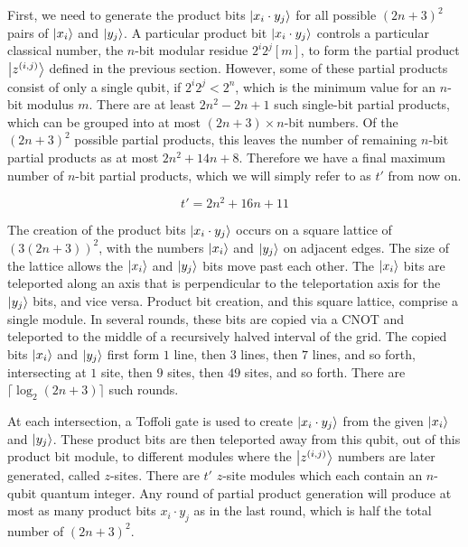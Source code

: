 \documentclass[twoside]{article}
\begin{document}
First, we need to generate the product bits
$\left\vert{x_i\cdot y_j}\right\rangle$ for all possible $(2n+3)^2$ pairs of $\left\vert{x_i}\right\rangle$ and
$\left\vert{y_j}\right\rangle$.
A particular product bit $\left\vert{x_i \cdot y_j}\right\rangle$
controls a particular classical number, the
$n$-bit modular residue $2^i 2^j [m]$, to form the partial product
$\left\vert{z^{(i,j)}}\right\rangle$ defined
in the previous section. However, some of these partial products
consist of only a single qubit, if $2^i 2^j < 2^n$, which is the minimum
value for an $n$-bit modulus $m$. There are at least $2n^2 - 2n + 1$
such single-bit partial products, which can be grouped into at most
$(2n+3)\times n$-bit numbers. Of the $(2n+3)^2$ possible partial products,
this leaves the number of remaining $n$-bit partial products as at most
$2n^2 + 14n +8$. Therefore we have a final maximum number of $n$-bit
partial products, which we will simply refer to as $t'$ from now on.

\begin{equation}
t'=2n^2+16n+11
\label{eqn:tprime}
\end{equation}

The creation of the product bits $\left\vert{x_i \cdot y_j}\right\rangle$ occurs on a
square lattice of $(3(2n+3))^2$, with the numbers $\left\vert{x_i}\right\rangle$ and
$\left\vert{y_j}\right\rangle$ on adjacent edges. The size of the lattice
allows the $\left\vert{x_i}\right\rangle$ and $\left\vert{y_j}\right\rangle$ bits move past each other.
The $\left\vert{x_i}\right\rangle$ bits are teleported along an axis that is perpendicular to
the teleportation axis for the $\left\vert{y_j}\right\rangle$ bits, and vice versa.
Product bit creation, and this square lattice, comprise a single module.
In several
rounds, these bits are copied via a CNOT and teleported to the middle of
a recursively halved interval of the grid. The copied bits $\left\vert{x_i}\right\rangle$ and
$\left\vert{y_j}\right\rangle$
first form $1$ line, then $3$ lines, then $7$ lines, and so forth,
intersecting at $1$ site, then $9$ sites, then $49$ sites, and so forth.
There are $\lceil \log_2 (2n+3) \rceil$ such rounds.

At each intersection, a Toffoli gate is used to create $\left\vert{x_i \cdot y_j}\right\rangle$
from the given $\left\vert{x_i}\right\rangle$ and $\left\vert{y_j}\right\rangle$. These product bits are then
teleported away from this qubit, out of this product bit module, to different
modules where the $\left\vert{z^{(i,j)}}\right\rangle$ numbers are later generated,
called $z$-sites. There are $t'$ $z$-site modules which each contain 
an $n$-qubit quantum integer. Any
round of partial product generation will produce at most as many product
bits $x_i \cdot y_j$ as in the last round, which is half the total number
of $(2n+3)^2$.
\end{document}
